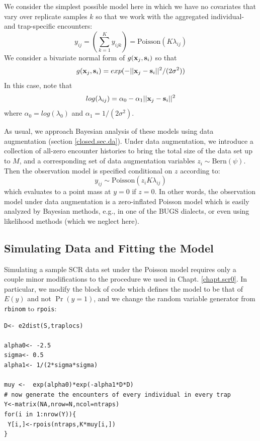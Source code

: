 We consider the simplest possible model here in which we have no
covariates that vary over replicate samples $k$ so that we work with
the aggregated individual- and trap-specific encounters:
\[
y_{ij} = (\sum_{k=1}^{K} y_{ijk}) =  \mbox{Poisson}(K  \lambda_{ij})
\]
We consider a bivariate normal form of $g({\bf x}_{j},{\bf s}_{i})$ so
that
\[
g({\bf x}_{j},{\bf s}_{i}) = exp( -||{\bf x}_{j} - {\bf
  s}_{i}||^{2} /(2\sigma^{2}))
\]
In this case, note that 
\[
log( \lambda_{ij})  =\alpha_{0} - \alpha_{1} ||{\bf x}_{j} - {\bf s}_{i}||^2
\]
where $\alpha_{0} = log(\lambda_{0})$ and $\alpha_1 = 1/(2\sigma^2)$.


As usual, we approach Bayesian analysis of these
models using data augmentation (section \ref{closed.sec.da}). 
Under data augmentation, we introduce a collection of all-zero encounter
histories to bring the total size of the data set up to $M$, and a corresponding
set of data augmentation variables $z_{i} \sim \mbox{Bern}(\psi)$. Then
the observation model is specified conditional on $z$ according to:
\[
y_{ij} \sim  \mbox{Poisson}(z_{i} K  \lambda_{ij})
\]
which evaluates to a point mass at $y=0$ if $z=0$.  In other words, the
observation model under data augmentation is a zero-inflated Poisson
model which is easily analyzed by Bayesian methods, e.g., in one of the BUGS
dialects, or even using likelihood methods (which we neglect here).



\subsection{Simulating Data and Fitting the Model}


Simulating a sample SCR data set under the Poisson model requires only
a couple minor modifications to the procedure we used in
Chapt. \ref{chapt.scr0}. In 
particular, we modify the block of code which defines the model to be
that of $E(y)$ and not $\Pr(y=1)$, and we change the random variable
generator from \mbox{\tt rbinom} to \mbox{\tt rpois}:
{\small
\begin{verbatim}
D<- e2dist(S,traplocs)

alpha0<- -2.5
sigma<- 0.5
alpha1<- 1/(2*sigma*sigma)

muy <-  exp(alpha0)*exp(-alpha1*D*D)
# now generate the encounters of every individual in every trap
Y<-matrix(NA,nrow=N,ncol=ntraps)
for(i in 1:nrow(Y)){
 Y[i,]<-rpois(ntraps,K*muy[i,])
}
\end{verbatim}
}

